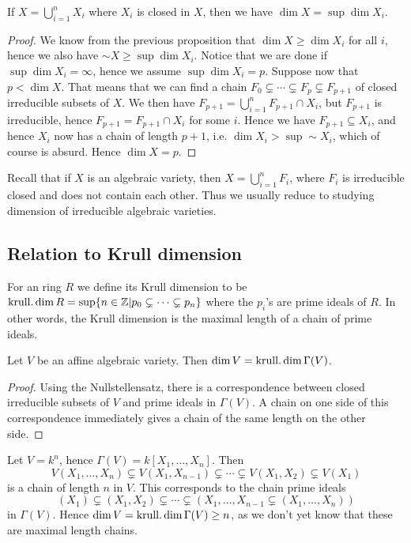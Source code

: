 \begin{proposition}
If $X=\bigcup_{i=1}^n X_i$ where $X_i$ is closed in $X$, then we have $\dim X = \sup\dim X_i$.
\end{proposition}
\begin{proof}
We know from the previous proposition that $\dim X \geq \dim X_i$ for all $i$, hence we also have $\sim X\geq \sup\dim X_i$. Notice that we are done if $\sup\dim X_i = \infty$, hence we assume $\sup\dim X_i = p$. Suppose now that $p< \dim X$. That means that we can find a chain $F_0\subsetneq \cdots \subsetneq F_p \subsetneq F_{p+1}$ of closed irreducible subsets of $X$. We then have $F_{p+1} = \bigcup_{i=1}^n F_{p+1}\cap X_i$, but $F_{p+1}$ is irreducible, hence $F_{p+1}=F_{p+1}\cap X_i$ for some $i$. Hence we have $F_{p+1}\subseteq X_i$, and hence $X_i$ now has a chain of length $p+1$, i.e. $\dim X_i > \sup\sim X_i$, which of course is absurd. Hence $\dim X=p$. 
\end{proof}

Recall that if $X$ is an algebraic variety, then $X=\bigcup_{i=1}^n F_i$, where $F_i$ is irreducible closed and does not contain each other. Thus we usually reduce to studying dimension of irreducible algebraic varieties. 

\subsection{Relation to Krull dimension}

For an ring $R$ we define its Krull dimension to be $\operatorname{krull.dim} R = \sup\{n\in \mathbb{Z} \vert p_0\subsetneq \cdots \subsetneq p_n\}$ where the $p_i$'s are prime ideals of $R$. In other words, the Krull dimension is the maximal length of a chain of prime ideals. 

\begin{proposition}
Let $V$ be an affine algebraic variety. Then $\dim V = \operatorname{krull.dim} \Gamma(V)$.
\end{proposition}
\begin{proof}
Using the Nullstellensatz, there is a correspondence between closed irreducible subsets of $V$ and prime ideals in $\Gamma(V)$. A chain on one side of this correspondence immediately gives a chain of the same length on the other side.  
\end{proof}

\begin{example}
Let $V=k^n$, hence $\Gamma(V)=k[X_1, \ldots, X_n]$. Then 
\begin{equation*}
    V(X_1, \ldots, X_n)\subsetneq V(X_1, X_{n-1})\subsetneq \cdots \subsetneq V(X_1, X_2)\subsetneq V(X_1)
\end{equation*}
is a chain of length $n$ in $V$. This corresponds to the chain prime ideals
\begin{equation*}
    (X_1)\subsetneq (X_1, X_2) \subsetneq \cdots \subsetneq (X_1, \ldots, X_{n-1}\subsetneq (X_1, \ldots, X_n))
\end{equation*}
in $\Gamma(V)$. Hence $\dim V = \operatorname{krull.dim} \Gamma(V)\geq n$, as we don't yet know that these are maximal length chains.
\end{example}

